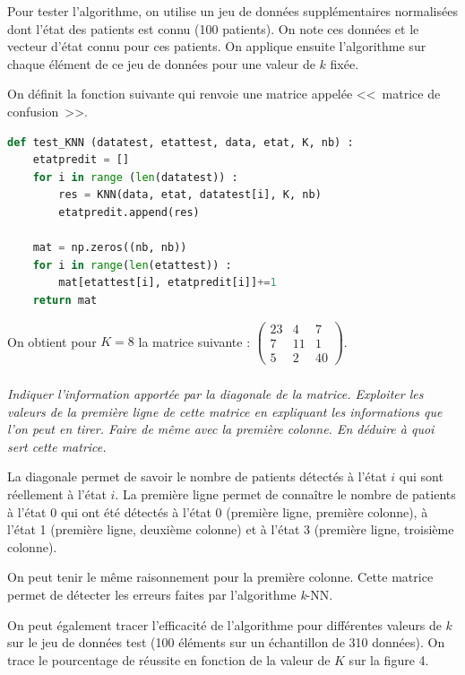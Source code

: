 \ifprof
\else

Pour tester l’algorithme, on utilise un jeu de données supplémentaires normalisées dont l’état des
patients est connu (100 patients). On note  ces données et  le vecteur d’état connu
pour ces patients. On applique ensuite l’algorithme sur chaque élément de ce jeu de données pour une
valeur de $k$ fixée.

On définit la fonction suivante qui renvoie une matrice appelée <<~matrice de confusion~>>.

\begin{lstlisting}[language=Python]
def test_KNN (datatest, etattest, data, etat, K, nb) :
    etatpredit = []
    for i in range (len(datatest)) :
        res = KNN(data, etat, datatest[i], K, nb)
        etatpredit.append(res)

    mat = np.zeros((nb, nb))
    for i in range(len(etattest)) :
        mat[etattest[i], etatpredit[i]]+=1
    return mat
\end{lstlisting}

On obtient pour $K = 8$ la matrice suivante : $\begin{pmatrix}23 & 4 & 7 \\ 7 & 11 & 1 \\ 5 & 2 & 40 \end{pmatrix}$.

\fi

\subparagraph{}\textit{Indiquer l’information apportée par la diagonale de la matrice. Exploiter les valeurs de la première ligne de cette matrice en expliquant les informations que l’on peut en tirer. Faire de
même avec la première colonne. En déduire à quoi sert cette matrice.}
\ifprof
\begin{corrige}
La diagonale permet de savoir le nombre de patients détectés à l'état $i$ qui sont réellement à l'état $i$.
La première ligne permet de connaître le nombre de patients à l'état 0 qui ont été détectés à l'état 0 (première ligne, première colonne), à l'état 1 (première ligne, deuxième colonne) et à l'état 3 (première ligne, troisième colonne).

On peut tenir le même raisonnement pour la première colonne. Cette matrice permet de détecter les erreurs faites par l'algorithme \textit{k}-NN.
\end{corrige}
\else
\fi

\ifprof
\else
On peut également tracer l’efficacité de l’algorithme pour différentes valeurs de $k$ sur le jeu de données
test (100 éléments sur un échantillon de 310 données). On trace le pourcentage de réussite en
fonction de la valeur de $K$ sur la figure 4.

